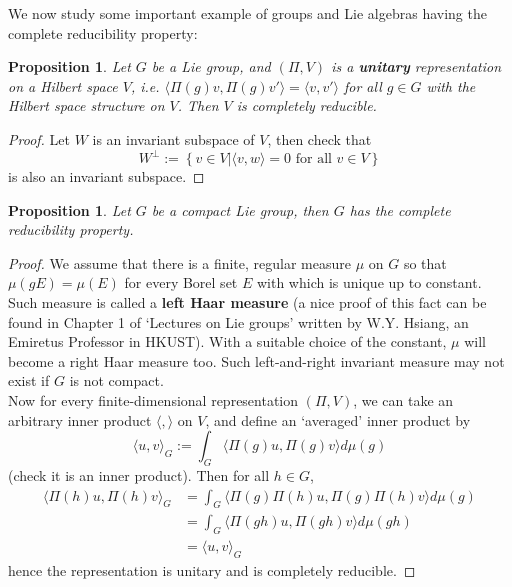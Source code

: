 \documentclass[11pt]{article}
\newtheorem{proposition}[theorem]{Proposition}
\begin{document}
We now study some important example of groups and Lie algebras having the complete reducibility property:
\begin{proposition}
Let $G$ be a Lie group, and $(\Pi,V)$ is a \textbf{unitary} representation on a Hilbert space $V$, i.e. $\langle \Pi(g)v, \Pi(g)v'\rangle = \langle v, v' \rangle$ for all $g \in G$ with the Hilbert space structure on $V$. Then $V$ is completely reducible.
\end{proposition}
\begin{proof}
Let $W$ is an invariant subspace of $V$, then check that
$$W^{\perp} := \left\{v \in V | \langle v, w \rangle = 0 \text{ for all }v \in V \right\}$$
is also an invariant subspace.
\end{proof}

\begin{proposition} \label{sscompred}
Let $G$ be a compact Lie group, then $G$ has the complete reducibility property.
\end{proposition}
\begin{proof}
We assume that there is a finite, regular measure $\mu$ on $G$ so that $\mu(gE) = \mu(E)$ for every Borel set $E$ with which is unique up to constant. Such measure is called a \textbf{left Haar measure} (a nice proof of this fact can be found in Chapter 1 of `Lectures on Lie groups' written by W.Y. Hsiang, an Emiretus Professor in HKUST). With a suitable choice of the constant, $\mu$ will become a right Haar measure too. Such left-and-right invariant measure may not exist if $G$ is not compact.\\
Now for every finite-dimensional representation $(\Pi,V)$, we can take an arbitrary inner product $\langle, \rangle$ on $V$, and define an `averaged' inner product by
$$\langle u,v \rangle_G := \int_G \langle \Pi(g)u, \Pi(g)v \rangle d\mu(g)$$
(check it is an inner product). Then for all $h \in G$,
\begin{align*}
\langle \Pi(h)u,\Pi(h)v \rangle_G &= \int_G \langle \Pi(g)\Pi(h)u, \Pi(g)\Pi(h)v \rangle d\mu(g)\\
&= \int_G \langle \Pi(gh)u, \Pi(gh)v \rangle d\mu(gh)\\
&= \langle u,v \rangle_G
\end{align*}
hence the representation is unitary and is completely reducible.
\end{proof}


\newpage
\end{document}
